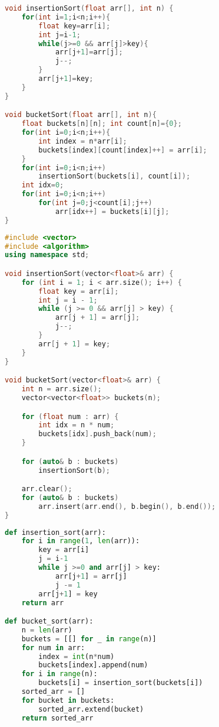 \begin{lstlisting}[language=C,caption={Bucket sort em C},captionpos=t]
void insertionSort(float arr[], int n) {
    for(int i=1;i<n;i++){
        float key=arr[i];
        int j=i-1;
        while(j>=0 && arr[j]>key){
            arr[j+1]=arr[j];
            j--;
        }
        arr[j+1]=key;
    }
}

void bucketSort(float arr[], int n){
    float buckets[n][n]; int count[n]={0};
    for(int i=0;i<n;i++){
        int index = n*arr[i];
        buckets[index][count[index]++] = arr[i];
    }
    for(int i=0;i<n;i++)
        insertionSort(buckets[i], count[i]);
    int idx=0;
    for(int i=0;i<n;i++)
        for(int j=0;j<count[i];j++)
            arr[idx++] = buckets[i][j];
}
\end{lstlisting}

\begin{lstlisting}[language=C++,caption={Bucket sort em C++},captionpos=t]
#include <vector>
#include <algorithm>
using namespace std;

void insertionSort(vector<float>& arr) {
    for (int i = 1; i < arr.size(); i++) {
        float key = arr[i];
        int j = i - 1;
        while (j >= 0 && arr[j] > key) {
            arr[j + 1] = arr[j];
            j--;
        }
        arr[j + 1] = key;
    }
}

void bucketSort(vector<float>& arr) {
    int n = arr.size();
    vector<vector<float>> buckets(n);

    for (float num : arr) {
        int idx = n * num;
        buckets[idx].push_back(num);
    }

    for (auto& b : buckets)
        insertionSort(b);

    arr.clear();
    for (auto& b : buckets)
        arr.insert(arr.end(), b.begin(), b.end());
}
\end{lstlisting}

\begin{lstlisting}[language=Python,caption={Bucket sort em Python},captionpos=t]
def insertion_sort(arr):
    for i in range(1, len(arr)):
        key = arr[i]
        j = i-1
        while j >=0 and arr[j] > key:
            arr[j+1] = arr[j]
            j -= 1
        arr[j+1] = key
    return arr

def bucket_sort(arr):
    n = len(arr)
    buckets = [[] for _ in range(n)]
    for num in arr:
        index = int(n*num)
        buckets[index].append(num)
    for i in range(n):
        buckets[i] = insertion_sort(buckets[i])
    sorted_arr = []
    for bucket in buckets:
        sorted_arr.extend(bucket)
    return sorted_arr
\end{lstlisting}

